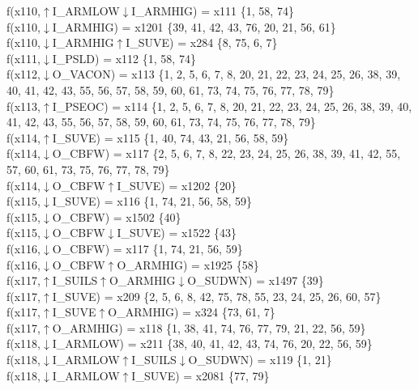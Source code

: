 f(x110,$\uparrow$I\_ARMLOW$\downarrow$I\_ARMHIG) = x111 \{1, 58, 74\} \\  
f(x110,$\downarrow$I\_ARMHIG) = x1201 \{39, 41, 42, 43, 76, 20, 21, 56, 61\} \\  
f(x110,$\downarrow$I\_ARMHIG$\uparrow$I\_SUVE) = x284 \{8, 75, 6, 7\} \\  
f(x111,$\downarrow$I\_PSLD) = x112 \{1, 58, 74\} \\  
f(x112,$\downarrow$O\_VACON) = x113 \{1, 2, 5, 6, 7, 8, 20, 21, 22, 23, 24, 25, 26, 38, 39, 40, 41, 42, 43, 55, 56, 57, 58, 59, 60, 61, 73, 74, 75, 76, 77, 78, 79\} \\  
f(x113,$\uparrow$I\_PSEOC) = x114 \{1, 2, 5, 6, 7, 8, 20, 21, 22, 23, 24, 25, 26, 38, 39, 40, 41, 42, 43, 55, 56, 57, 58, 59, 60, 61, 73, 74, 75, 76, 77, 78, 79\} \\  
f(x114,$\uparrow$I\_SUVE) = x115 \{1, 40, 74, 43, 21, 56, 58, 59\} \\  
f(x114,$\downarrow$O\_CBFW) = x117 \{2, 5, 6, 7, 8, 22, 23, 24, 25, 26, 38, 39, 41, 42, 55, 57, 60, 61, 73, 75, 76, 77, 78, 79\} \\  
f(x114,$\downarrow$O\_CBFW$\uparrow$I\_SUVE) = x1202 \{20\} \\  
f(x115,$\downarrow$I\_SUVE) = x116 \{1, 74, 21, 56, 58, 59\} \\  
f(x115,$\downarrow$O\_CBFW) = x1502 \{40\} \\  
f(x115,$\downarrow$O\_CBFW$\downarrow$I\_SUVE) = x1522 \{43\} \\  
f(x116,$\downarrow$O\_CBFW) = x117 \{1, 74, 21, 56, 59\} \\  
f(x116,$\downarrow$O\_CBFW$\uparrow$O\_ARMHIG) = x1925 \{58\} \\  
f(x117,$\uparrow$I\_SUILS$\uparrow$O\_ARMHIG$\downarrow$O\_SUDWN) = x1497 \{39\} \\  
f(x117,$\uparrow$I\_SUVE) = x209 \{2, 5, 6, 8, 42, 75, 78, 55, 23, 24, 25, 26, 60, 57\} \\  
f(x117,$\uparrow$I\_SUVE$\uparrow$O\_ARMHIG) = x324 \{73, 61, 7\} \\  
f(x117,$\uparrow$O\_ARMHIG) = x118 \{1, 38, 41, 74, 76, 77, 79, 21, 22, 56, 59\} \\  
f(x118,$\downarrow$I\_ARMLOW) = x211 \{38, 40, 41, 42, 43, 74, 76, 20, 22, 56, 59\} \\  
f(x118,$\downarrow$I\_ARMLOW$\uparrow$I\_SUILS$\downarrow$O\_SUDWN) = x119 \{1, 21\} \\  
f(x118,$\downarrow$I\_ARMLOW$\uparrow$I\_SUVE) = x2081 \{77, 79\} \\  
